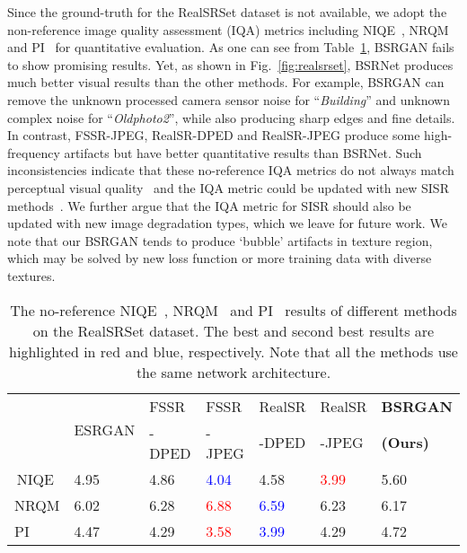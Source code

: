 \documentclass[10pt,twocolumn,letterpaper]{article}
\begin{document}
Since the ground-truth for the RealSRSet dataset is not available, we adopt the non-reference image quality assessment (IQA) metrics including NIQE~\cite{mittal2012making}, NRQM~\cite{ma2017learning} and PI~\cite{blau20182018} for quantitative evaluation. As one can see from Table~\ref{table:realsrset}, BSRGAN fails to show promising results. Yet, as shown in Fig.~\ref{fig:realsrset}, BSRNet produces much better visual results than the other methods. For example, BSRGAN can remove the unknown processed camera sensor noise for ``\emph{Building}'' and unknown complex noise for ``\emph{Oldphoto2}'', while also producing sharp edges and fine details. In contrast, FSSR-JPEG, RealSR-DPED and RealSR-JPEG produce some high-frequency artifacts but have better quantitative results than BSRNet.
Such inconsistencies indicate that these no-reference IQA metrics do not always match perceptual visual quality~\cite{lugmayr2020ntire} and the IQA metric could be updated with new SISR methods~\cite{gu2020pipal}.
We further argue that the IQA metric for SISR should also be updated with new image degradation types, which we leave for future work.
We note that our BSRGAN tends to produce `bubble' artifacts in texture region, which may be solved by new loss function or more training data with diverse textures.




\begin{table}[!tbp]\scriptsize
\vspace{0.04cm}
\caption{The no-reference NIQE~\cite{mittal2012making}, NRQM~\cite{ma2017learning} and PI~\cite{blau20182018} results of different methods on the RealSRSet dataset. The best and second best results are highlighted in red and blue, respectively. Note that all the methods use the same network architecture.}
\center
\begin{tabular}{l|p{0.75cm}<{\centering}|p{.73cm}<{\centering}|p{.66cm}<{\centering}|p{.73cm}<{\centering}|p{.66cm}<{\centering}|p{0.8cm}<{\centering}}
\hline
\footnotesize{\multirow{2}{*}{\;Metric}}&\multirow{2}{*}{\hspace{-0.08cm}ESRGAN}& FSSR & FSSR & RealSR & RealSR &\textbf{BSRGAN}\\
& & \scriptsize -DPED & \scriptsize -JPEG & \scriptsize -DPED & \scriptsize -JPEG & \textbf{(Ours)}\\ \hline \hline
\,NIQE & \footnotesize 4.95 &\footnotesize 4.86 & \footnotesize \textcolor{blue}{4.04}  &\footnotesize  4.58  & \footnotesize \textcolor{red}{3.99} & \footnotesize   5.60\\
NRQM &\footnotesize  6.02 &\footnotesize  6.28 & \footnotesize \textcolor{red}{6.88} &\footnotesize  \textcolor{blue}{6.59}  &\footnotesize  6.23 &\footnotesize  6.17  \\
\;\;PI &\footnotesize  4.47 &\footnotesize  4.29 &\footnotesize  \textcolor{red}{3.58} &\footnotesize  \textcolor{blue}{3.99}  &\footnotesize  4.29 &\footnotesize  4.72  \\
\hline
\end{tabular}
\vspace{-0.2cm}
\label{table:realsrset}
\end{table}
\end{document}

